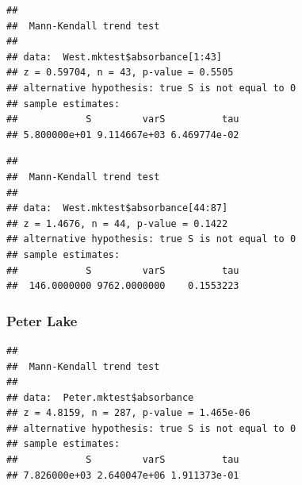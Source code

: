 \documentclass[12pt,]{article}
\newenvironment{Shaded}{\begin{snugshade}}{\end{snugshade}}
\newcommand{\KeywordTok}[1]{\textcolor[rgb]{0.13,0.29,0.53}{\textbf{#1}}}
\newcommand{\DecValTok}[1]{\textcolor[rgb]{0.00,0.00,0.81}{#1}}
\newcommand{\StringTok}[1]{\textcolor[rgb]{0.31,0.60,0.02}{#1}}
\newcommand{\CommentTok}[1]{\textcolor[rgb]{0.56,0.35,0.01}{\textit{#1}}}
\newcommand{\OperatorTok}[1]{\textcolor[rgb]{0.81,0.36,0.00}{\textbf{#1}}}
\newcommand{\NormalTok}[1]{#1}
\begin{document}
\begin{verbatim}
## 
##  Mann-Kendall trend test
## 
## data:  West.mktest$absorbance[1:43]
## z = 0.59704, n = 43, p-value = 0.5505
## alternative hypothesis: true S is not equal to 0
## sample estimates:
##            S         varS          tau 
## 5.800000e+01 9.114667e+03 6.469774e-02
\end{verbatim}

\begin{Shaded}
\end{Shaded}

\begin{verbatim}
## 
##  Mann-Kendall trend test
## 
## data:  West.mktest$absorbance[44:87]
## z = 1.4676, n = 44, p-value = 0.1422
## alternative hypothesis: true S is not equal to 0
## sample estimates:
##            S         varS          tau 
##  146.0000000 9762.0000000    0.1553223
\end{verbatim}

\subsubsection{Peter Lake}\label{peter-lake}

\begin{Shaded}
\end{Shaded}

\begin{verbatim}
## 
##  Mann-Kendall trend test
## 
## data:  Peter.mktest$absorbance
## z = 4.8159, n = 287, p-value = 1.465e-06
## alternative hypothesis: true S is not equal to 0
## sample estimates:
##            S         varS          tau 
## 7.826000e+03 2.640047e+06 1.911373e-01
\end{verbatim}
\end{document}
